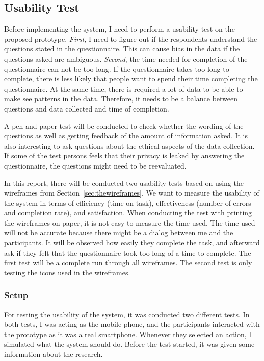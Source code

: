   \subsection{Usability Test}\label{sec:pretest}
  Before implementing the system, I need to perform a usability test on the proposed prototype. {\it First}, I need to figure out if the respondents understand the questions stated in the questionnaire. This can cause bias in the data if the questions asked are ambiguous. {\it Second}, the time needed for completion of the questionnaire can not be too long. If the questionnaire takes too long to complete, there is less likely that people want to spend their time completing the questionnaire. At the same time, there is required a lot of data to be able to make see patterns in the data. Therefore, it needs to be a balance between questions and data collected and time of completion.

  A pen and paper test will be conducted to check whether the wording of the questions as well as getting feedback of the amount of information asked. It is also interesting to ask questions about the ethical aspects of the data collection. If some of the test persons feels that their privacy is leaked by answering the questionnaire, the questions might need to be reevaluated.

  In this report, there will be conducted two usability tests based on using the wireframes from Section~\ref{sec:thewireframes}. We want to measure the usability of the system in terms of efficiency (time on task), effectiveness (number of errors and completion rate), and satisfaction. When conducting the test with printing the wireframes on paper, it is not easy to measure the time used. The time used will not be accurate because there might be a dialog between me and the participants. It will be observed how easily they complete the task, and afterward ask if they felt that the questionnaire took too long of a time to complete. The first test will be a complete run through all wireframes. The second test is only testing the icons used in the wireframes.

  \subsubsection*{Setup}

  For testing the usability of the system, it was conducted two different tests. In both tests, I was acting as the mobile phone, and the participants interacted with the prototype as it was a real smartphone. Whenever they selected an action, I simulated what the system should do.
  Before the test started, it was given some information about the research.  
  
